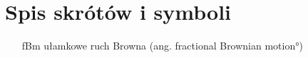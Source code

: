 \chapter{Spis skrótów i symboli}

\begin{itemize}
\item[fBm] ułamkowe ruch Browna (ang. \ang{fractional Brownian motion})
\end{itemize}
